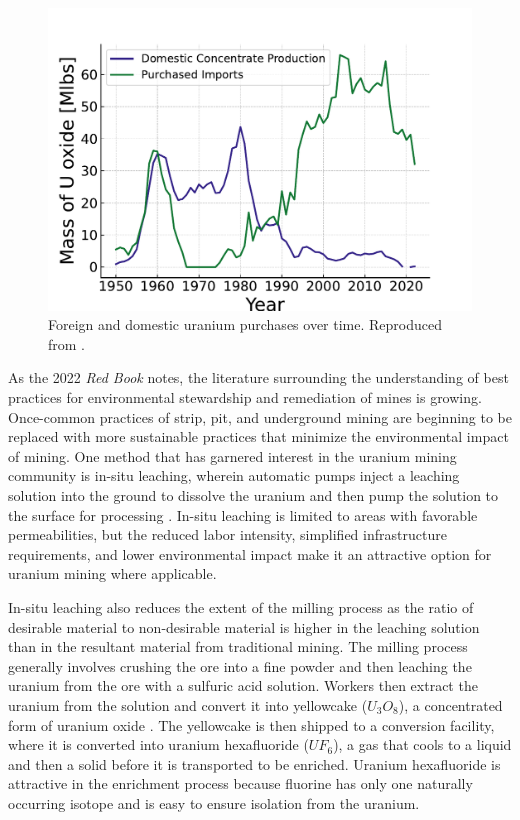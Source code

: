 \begin{figure}[H]
   \centering
   \includegraphics[scale=0.7]{images/intro/uranium_production_imports.pdf}
   \caption{Foreign and domestic uranium purchases over time. Reproduced from \cite{eia_monthly_energy_review_2024}.}
   \label{fig:foregin_u3o8}
\end{figure}

As the 2022 \textit{Red Book} notes, the literature surrounding the understanding of best practices for environmental stewardship and remediation of mines is growing. Once-common practices of strip, pit, and underground
mining are beginning to be replaced with more sustainable practices that
minimize the environmental impact of mining. One method that has garnered
interest in the uranium mining community is in-situ leaching, wherein automatic pumps inject a leaching solution into the ground to dissolve the uranium and then pump the solution to the surface for processing \cite{insitu_review_2024}. In-situ leaching is limited to areas with favorable permeabilities, but the reduced labor intensity, simplified infrastructure requirements, and lower environmental impact make it an attractive option for uranium mining where applicable.

In-situ leaching also reduces the extent of the milling process as the ratio of
desirable material to non-desirable material is higher in the leaching solution
than in the resultant material from traditional mining. The milling process
generally involves crushing the ore into a fine powder and then leaching the
uranium from the ore with a sulfuric acid solution. Workers then extract the
uranium from the solution and convert it into yellowcake ($U_3O_8$), a
concentrated form of uranium oxide \cite{milling_uranium_2022}. The yellowcake
is then shipped to a conversion facility, where it is converted into uranium
hexafluoride ($UF_6$), a gas that cools to a liquid and then a solid before it
is transported to be enriched. Uranium hexafluoride is attractive in the
enrichment process because fluorine has only one naturally occurring isotope
and is easy to ensure isolation from the uranium.

